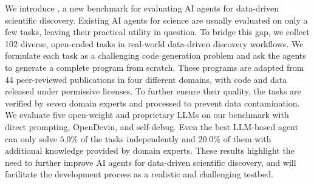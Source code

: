 We introduce \bench, a new benchmark for evaluating AI agents for data-driven scientific discovery. 
Existing AI agents for science are usually evaluated on only a few tasks, leaving their practical utility in question. 
To bridge this gap, we collect 102 diverse, open-ended tasks in real-world data-driven discovery workflows.
We formulate each task as a challenging code generation problem and ask the agents to generate a complete program from scratch.
These programs are adapted from 44 peer-reviewed publications in four different domains, with code and data released under permissive licenses.
To further ensure their quality, the tasks are verified by seven domain experts and processed to prevent data contamination.
We evaluate five open-weight and proprietary LLMs on our benchmark with direct prompting, OpenDevin, and self-debug.
Even the best LLM-based agent can only solve $5.0\%$ of the tasks independently and $20.0\%$ of them with additional knowledge provided by domain experts.
These results highlight the need to further improve AI agents for data-driven scientific discovery, and \bench will facilitate the development process as a realistic and challenging testbed.

